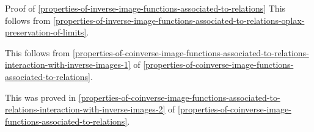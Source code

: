 \begin{Proof}{Proof of \cref{properties-of-inverse-image-functions-associated-to-relations}}
    This follows from \cref{properties-of-inverse-image-functions-associated-to-relations-oplax-preservation-of-limits}.

    This follows from \cref{properties-of-coinverse-image-functions-associated-to-relations-interaction-with-inverse-images-1} of \cref{properties-of-coinverse-image-functions-associated-to-relations}.

    This was proved in \cref{properties-of-coinverse-image-functions-associated-to-relations-interaction-with-inverse-images-2} of \cref{properties-of-coinverse-image-functions-associated-to-relations}.
\end{Proof}
